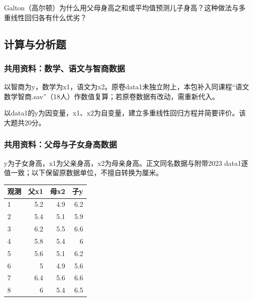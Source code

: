 \par\addvspace{6pt}\noindent\begin{minipage}{\linewidth}


Galton（高尔顿）为什么用父母身高之和或平均值预测儿子身高？这种做法与多重线性回归各有什么优劣？



\end{minipage}\par\vspace{4pt}

\subsection{计算与分析题}

\subsubsection*{共用资料：数学、语文与智商数据}

以智商为y，数学为x1，语文为x2。原卷data1未独立附上，本包补入同课程``语文数学智商.sav''（18人）作数值复算；若原卷数据有改动，需重新代入。


\par\addvspace{6pt}\noindent\begin{minipage}{\linewidth}


以data1的y为因变量，x1、x2为自变量，建立多重线性回归方程并简要评价。该大题共20分。



\end{minipage}\par\vspace{4pt}

\subsubsection*{共用资料：父母与子女身高数据}

y为子女身高，x1为父亲身高，x2为母亲身高。正文同名数据与附带2023 data1逐值一致；以下保留原数据单位，不擅自转换为厘米。

\begin{center}\small\setlength{\tabcolsep}{3.5pt}\renewcommand{\arraystretch}{1.18}\begin{tabular}{@{}lrrr@{}}
\toprule
观测 & 父x1 & 母x2 & 子y \\
\midrule

1 & 5.2 & 4.9 & 6.2 \\
2 & 5.4 & 5.1 & 5.9 \\
3 & 6.2 & 5.5 & 6.6 \\
4 & 5.8 & 5.4 & 6 \\
5 & 5.6 & 5.1 & 6.2 \\
6 & 5 & 4.9 & 5.6 \\
7 & 6.4 & 5.6 & 6.6 \\
8 & 6 & 5.4 & 6.5 \\
\bottomrule\end{tabular}\end{center}


